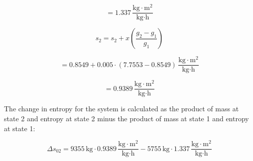 \[ = 1.337 \, \frac{\text{kg} \cdot \text{m}^2}{\text{kg} \cdot \text{h}} \]

\[ s_2 = s_2 + x \left( \frac{g_2 - g_1}{g_1} \right) \]

\[ = 0.8549 + 0.005 \cdot (7.7553 - 0.8549) \, \frac{\text{kg} \cdot \text{m}^2}{\text{kg} \cdot \text{h}} \]

\[ = 0.9389 \, \frac{\text{kg} \cdot \text{m}^2}{\text{kg} \cdot \text{h}} \]

The change in entropy for the system is calculated as the product of mass at state 2 and entropy at state 2 minus the product of mass at state 1 and entropy at state 1:

\[ \Delta s_{02} = 9355 \, \text{kg} \cdot 0.9389 \, \frac{\text{kg} \cdot \text{m}^2}{\text{kg} \cdot \text{h}} - 5755 \, \text{kg} \cdot 1.337 \, \frac{\text{kg} \cdot \text{m}^2}{\text{kg} \cdot \text{h}} \]